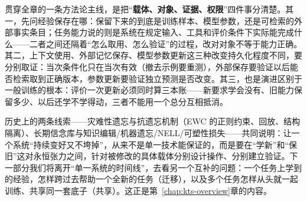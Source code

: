 贯穿全章的一条方法论主线，是把“\textbf{载体、对象、证据、权限}”四件事分清楚。其一，先问经验保存在哪：保留下来的到底是训练样本、模型参数，还是可检索的外部事实条目；任务能力说的则是系统在规定输入、工具和评价条件下实际能完成什么——二者之间还隔着“怎么取用、怎么验证”的过程，改对对象不等于能力正确。其二，上下文使用、外部记忆保存、模型参数更新这三种改变持久化程度不同，要分别取证：当次条件化只在当次有效（撤去示例要重测），外部保存要验证以后能否检索取到正确版本，参数更新要验证独立预测是否改变。其三，也是演进区别于一般训练的根本：评价一次更新必须同时算三本账——新要求学会没有、旧能力保留多少、以后还学不学得动，三者不能用一个总分互相抵消。

历史上的两条线索——灾难性遗忘与抗遗忘机制（EWC 的正则约束、回放、结构隔离）、长期信念库与知识编辑/机器遗忘/NELL/可塑性损失——共同说明：让一个系统“持续变好又不垮掉”，从来不是单一技术能保证的，而是要在“学新”和“保旧”这对永恒张力之间，针对被修改的具体载体分别设计操作、分别建立验证。下一部分我们将离开“单一系统的时间线”，去看另一个互补的问题：一个任务上学到的经验，怎样跨过去帮助一个全新的任务（迁移），以及多个任务怎样从头就一起训练、共享同一套底子（共享）。这正是第~\ref{chap:kts-overview}章的内容。
